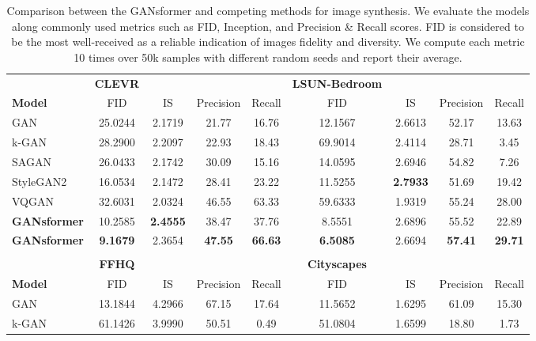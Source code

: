 \documentclass{article}
\begin{document}
 \begin{table*}[ht]
\caption{Comparison between the GANsformer and competing methods for image synthesis. We evaluate the models along commonly used metrics such as FID, Inception, and Precision \& Recall scores. FID is considered to be the most well-received as a reliable indication of images fidelity and diversity. We compute each metric 10 times over 50k samples with different random seeds and report their average.}
\vspace*{5.5pt}
\label{table1}
\centering
\scriptsize
\begin{tabular}{lcccccccc}
\rowcolor{Blue1}
\scriptsize & {\color{Blue} \textbf{CLEVR}} &  &  &  & {\color{Blue} \textbf{LSUN-Bedroom}} &  &  &  \\ 
\rowcolor{Blue1}
\textbf{Model} & FID  & IS  & Precision  & Recall  & FID  & IS  & Precision  & Recall  \\
\scriptsize GAN & 25.0244 & 2.1719 & 21.77 & 16.76 & 12.1567 & 2.6613 & 52.17 & 13.63 \\
\scriptsize k-GAN & 28.2900 & 2.2097 & 22.93 & 18.43 & 69.9014 & 2.4114 & 28.71 & 3.45 \\
\scriptsize SAGAN & 26.0433 & 2.1742 & 30.09 & 15.16 & 14.0595 & 2.6946 & 54.82 & 7.26 \\
\scriptsize StyleGAN2 & 16.0534 & 2.1472 & 28.41 & 23.22 & 11.5255 & \textbf{2.7933} & 51.69 & 19.42 \\
\scriptsize VQGAN & 32.6031 & 2.0324 & 46.55 & 63.33 & 59.6333 & 1.9319 & 55.24 & 28.00 \\
\rowcolor{Blue2}
\scriptsize \textbf{GANsformer} & 10.2585 & \textbf{2.4555} & 38.47 & 37.76 & 8.5551 & 2.6896 & 55.52 & 22.89 \\
\rowcolor{Blue2}
\scriptsize \textbf{GANsformer} & \textbf{9.1679} & 2.3654 & \textbf{47.55} & \textbf{66.63} & \textbf{6.5085} & 2.6694 & \textbf{57.41} & \textbf{29.71} \\
\rowcolor{Gray}
\tiny  &  &  &  &  &  &  &  &  \\
\rowcolor{Blue1}
\scriptsize & {\color{Blue} \textbf{FFHQ}} &  &  &  & {\color{Blue} \textbf{Cityscapes}} &  &  &  \\ 
\rowcolor{Blue1}
\textbf{Model} & FID  & IS  & Precision  & Recall  & FID  & IS  & Precision  & Recall  \\
\scriptsize GAN & 13.1844 & 4.2966 & 67.15 & 17.64 & 11.5652 & 1.6295 & 61.09 & 15.30  \\
\scriptsize k-GAN & 61.1426 & 3.9990 & 50.51 & 0.49 & 51.0804 & 1.6599 & 18.80 & 1.73 \\

\end{tabular}
\end{table*}
\end{document}
